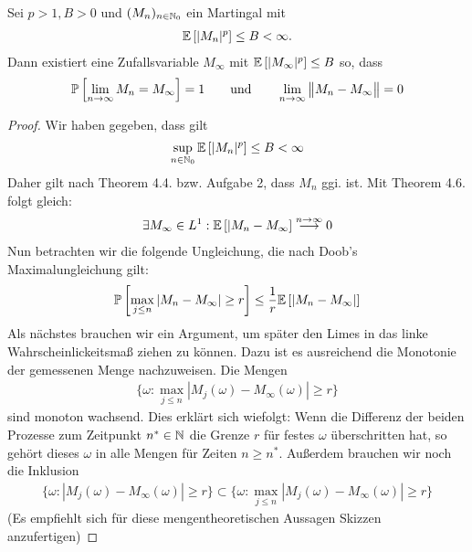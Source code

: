 \documentclass[12pt,a4paper]{article}
\begin{document}
\begin{theorem}\enter
Sei $p>1,B>0$ und $(M_n)_{n\in\mathbb{N}_0}$ ein Martingal mit 
\begin{align*}
\mathbb{E}\left[|M_n|^p\right]\leq B<\infty.
\end{align*}
Dann existiert eine Zufallsvariable $M_\infty$ mit $\mathbb{E}\left[|M_\infty|^p\right]\leq B$ so, dass
\begin{align*}
\mathbb{P}\left[\lim\limits_{n\to\infty} M_n=M_\infty\right]=1
\qquad\text{und}\qquad
\lim\limits_{n\to\infty}\big\Vert M_n-M_\infty\big\Vert=0
\end{align*}
\end{theorem}
\begin{proof}
	Wir haben gegeben, dass gilt
	\begin{align*}
		\sup\limits_{n\in\mathbb{N}_0} \mathbb{E}\left[|M_n|^p\right] \leq B < \infty
	\end{align*}
	Daher gilt nach Theorem 4.4. bzw. Aufgabe 2, dass $M_n$ ggi. ist.
	Mit Theorem 4.6. folgt gleich:
	\begin{align*}
		\exists M_\infty \in L^1 : \mathbb{E}\left[|M_n - M_\infty\right]\stackrel{n\rightarrow \infty}{\longrightarrow} 0
	\end{align*}
	Nun betrachten wir die folgende Ungleichung, die nach Doob's Maximalungleichung gilt:
	\begin{align*}
		\mathbb{P}\left[\max\limits_{j\leq n} |M_n - M_\infty| \geq r\right] \leq \frac{1}{r} \mathbb{E}\left[|M_n-M_\infty|\right]
	\end{align*}
	Als nächstes brauchen wir ein Argument, um später den Limes in das linke Wahrscheinlickeitsmaß ziehen zu können. Dazu ist es ausreichend die Monotonie der gemessenen Menge nachzuweisen. Die Mengen
	\begin{align*}
		\lbrace \omega : \max\limits_{j\leq n} |M_j(\omega) - M_\infty(\omega)| \geq r\rbrace
	\end{align*}
	sind monoton wachsend. Dies erklärt sich wiefolgt:
	Wenn die Differenz der beiden Prozesse zum Zeitpunkt $n^*\in\mathbb{N}$ die Grenze $r$ für festes $\omega$ überschritten hat, so gehört dieses $\omega$ in alle Mengen für Zeiten $n\geq n^*$.
	Außerdem brauchen wir noch die Inklusion
	\begin{align*}
		\lbrace \omega : |M_j(\omega) - M_\infty(\omega)| \geq r\rbrace
		\subset
		\lbrace \omega : \max\limits_{j\leq n} |M_j(\omega) - M_\infty(\omega)| \geq r\rbrace
	\end{align*}
	(Es empfiehlt sich für diese mengentheoretischen Aussagen Skizzen anzufertigen) \enter

\end{proof}
\end{document}
